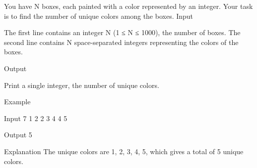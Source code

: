 
You have N boxes, each painted with a color represented by an integer. Your task is to find the number of unique colors among the boxes.
Input

    The first line contains an integer N (1 ≤ N ≤ 1000), the number of boxes.
    The second line contains N space-separated integers representing the colors of the boxes.

Output

    Print a single integer, the number of unique colors.

Example

Input
7
1 2 2 3 4 4 5

Output
5

Explanation
The unique colors are 1, 2, 3, 4, 5, which gives a total of 5 unique colors.